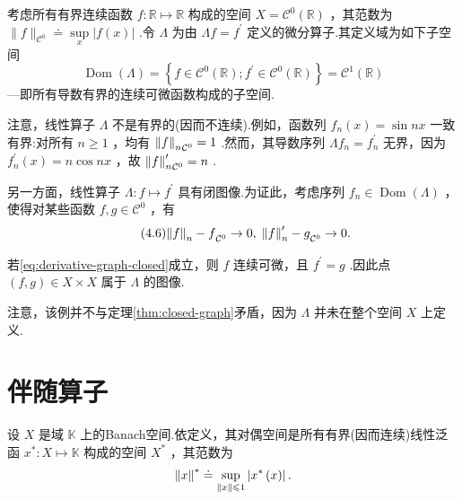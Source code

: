 \begin{instance}\label{ins:derivative-operator-not-bounded-but-closed}
考虑所有有界连续函数 $f : \mathbb{R} \mapsto  \mathbb{R}$ 构成的空间 $X = {\mathcal{C}}^{0}\left( \mathbb{R}\right)$ ，其范数为 $\| f{\| }_{{\mathcal{C}}^{0}} \doteq  \mathop{\sup }\limits_{x}\left| {f\left( x\right) }\right|$ .令 $\Lambda$ 为由 ${\Lambda f} = {f}^{\prime }$ 定义的微分算子.其定义域为如下子空间
\[
\operatorname{Dom}\left( \Lambda \right)  = \left\{  {f \in  {\mathcal{C}}^{0}\left( \mathbb{R}\right) ;{f}^{\prime } \in  {\mathcal{C}}^{0}\left( \mathbb{R}\right) }\right\}   = {\mathcal{C}}^{1}\left( \mathbb{R}\right)
\]
---即所有导数有界的连续可微函数构成的子空间.

注意，线性算子 $\Lambda$ 不是有界的(因而不连续).例如，函数列 ${f}_{n}\left( x\right)  = \sin {nx}$ 一致有界:对所有 $n \geq  1$ ，均有 ${\norm{f}_{n}}_{{\mathcal{C}}^{0}} = 1$ .然而，其导数序列 $\Lambda {f}_{n} = {f}_{n}^{\prime }$ 无界，因为 ${f}_{n}^{\prime }\left( x\right)  = n\cos {nx}$ ，故 ${\norm{f}_{n}^{\prime }}_{{\mathcal{C}}^{0}} = n$ .

另一方面，线性算子 $\Lambda  : f \mapsto  {f}^{\prime }$ 具有闭图像.为证此，考虑序列 ${f}_{n} \in  \operatorname{Dom}\left( \Lambda \right)$ ，使得对某些函数 $f,g \in  {\mathcal{C}}^{0}$ ，有
\begin{equation}\tag{4.6}\label{eq:derivative-graph-closed}
{\norm{f}_{n} - f}_{{\mathcal{C}}^{0}} \rightarrow  0,\;{\norm{f}_{n}^{\prime } - g}_{{\mathcal{C}}^{0}} \rightarrow  0.
\end{equation}

若\eqref{eq:derivative-graph-closed}成立，则 $f$ 连续可微，且 ${f}^{\prime } = g$ .因此点 $\left( {f,g}\right)  \in  X \times  X$ 属于 $\Lambda$ 的图像.

注意，该例并不与定理\ref{thm:closed-graph}矛盾，因为 $\Lambda$ 并未在整个空间 $X$ 上定义.
\end{instance}

\section{伴随算子}

设 $X$ 是域 $\mathbb{K}$ 上的Banach空间.依定义，其对偶空间是所有有界(因而连续)线性泛函 ${x}^{ * } : X \mapsto  \mathbb{K}$ 构成的空间 ${X}^{ * }$ ，其范数为
\[
\norm{x}^{ * } \doteq  \mathop{\sup }\limits_{{\| x\|  \leqslant  1}}\left| {{x}^{ * }\left( x\right) }\right| .
\]

